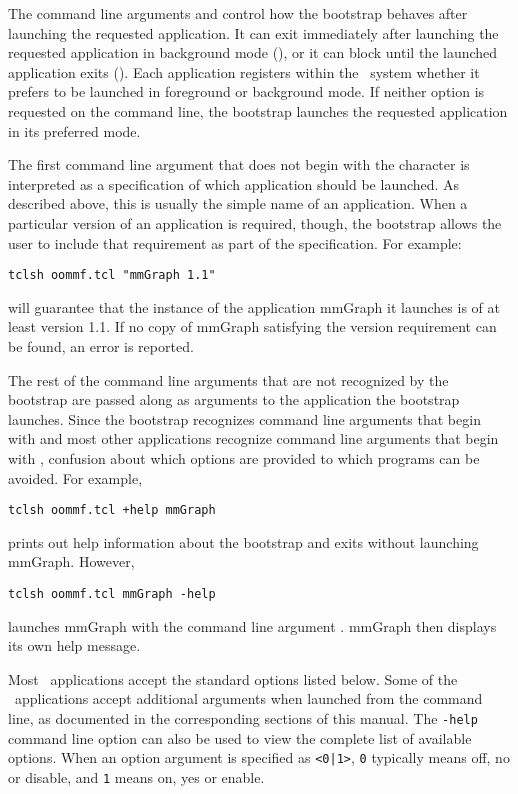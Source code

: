 The command line arguments  and  control how the
bootstrap behaves after launching the requested application.  It
can exit immediately after launching the requested application
in background mode (), or it can block until the
launched application exits ().  Each application
registers within the \OOMMF\ system whether it prefers to be launched
in foreground or background mode.  If neither option is requested on
the command line, the bootstrap launches the requested application
in its preferred mode.

The first command line argument that does not begin with the
character \cd{+} is interpreted as a specification of which
application should be launched.  As described above, this is
usually the simple name of an application.
When a particular
version of an application is required, though, the bootstrap
allows the user to include that requirement as part of the
specification.  For example:
\begin{verbatim}
tclsh oommf.tcl "mmGraph 1.1"
\end{verbatim}
will guarantee that the instance of the application mmGraph it
launches is of at least version 1.1.  If no copy of mmGraph
satisfying the version requirement can be found, an error is
reported.

The rest of the command line arguments that are not recognized by
the bootstrap are passed along as arguments to the application the
bootstrap launches.  Since the bootstrap recognizes command line
arguments that begin with \cd{+} and most other applications
recognize command line arguments that begin with \cd{-}, confusion
about which options are provided to which programs can be avoided.
For example,
\begin{verbatim}
tclsh oommf.tcl +help mmGraph
\end{verbatim}
prints out help information about the bootstrap and exits without
launching mmGraph.  However,
\begin{verbatim}
tclsh oommf.tcl mmGraph -help
\end{verbatim}
launches mmGraph with the command line argument .
mmGraph then displays its own help message.

Most \OOMMF\ applications accept the standard options listed below.
Some of the \OOMMF\ applications accept additional arguments when
launched from the command line, as documented in the corresponding
sections of this manual.  The \verb+-help+ command line option can
also be used to view the complete list of available options.  When an
option argument is specified as \verb+<0|1>+, \verb+0+ typically means
off, no or disable, and \verb+1+ means on, yes or enable.

